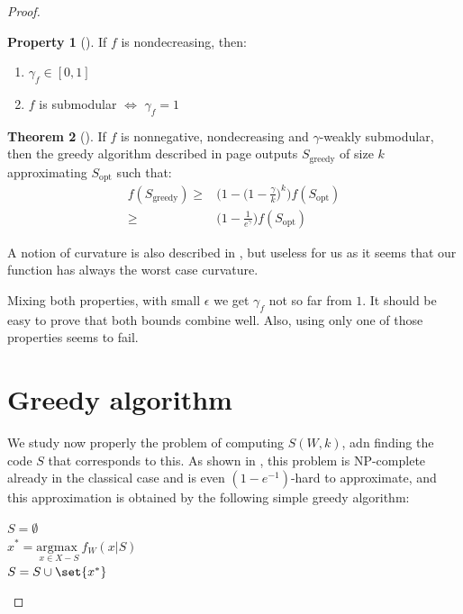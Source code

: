 \documentclass{article}
\theoremstyle{definition}
\newtheorem{theo}{Theorem}[section]
\newtheorem{prop}[theo]{Property}
\theoremstyle{remark}
\begin{document}
\begin{proof}
    \begin{prop}[\cite{BBKT17}]
      If $f$ is nondecreasing, then:
      \begin{enumerate}[label={(\arabic*)}]
      \item $\gamma_f \in [0,1]$
      \item $f$ is submodular $\Leftrightarrow$ $\gamma_f = 1$
      \end{enumerate}
    \end{prop}
    
    \begin{theo}[\cite{BBKT17}]
      If $f$ is nonnegative, nondecreasing and $\gamma$-weakly submodular, then the greedy algorithm described in page \pageref{greedy} outputs $S_{\text{greedy}}$ of size $k$ approximating $S_{\text{opt}}$ such that:
      \begin{equation}
        \begin{aligned}
          f(S_{\text{greedy}}) \geq& \Big(1-\Big(1-\frac{\gamma}{k}\Big)^k\Big)f(S_{\text{opt}})\\
          \geq& \Big(1-\frac{1}{e^{\gamma}}\Big)f(S_{\text{opt}})
        \end{aligned}
      \end{equation}
    \end{theo}

    A notion of curvature is also described in \cite{BBKT17}, but useless for us as it seems that our function has always the worst case curvature.

    Mixing both properties, with small $\epsilon$ we get $\gamma_f$ not so far from $1$. It should be easy to prove that both bounds combine well. Also, using only one of those properties seems to fail.

    \newpage
    
    \section{Greedy algorithm}
We study now properly the problem of computing $S(W,k)$, adn finding the code $S$ that corresponds to this. As shown in \cite{BF17}, this problem is NP-complete already in the classical case and is even $(1-e^{-1})$-hard to approximate, and this approximation is obtained by the following simple greedy algorithm:
    
    \begin{algorithm}[H]
      \DontPrintSemicolon
      
      $S = \emptyset$\\
         {
           $x^* = \underset{x \in X-S}{\text{argmax }} f_W(x|S)$\\
           $S = S \cup \set{x^*}$
         }


\end{algorithm}
\end{proof}
\end{document}
